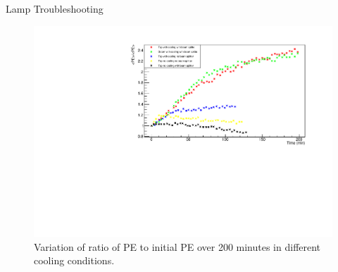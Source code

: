 \documentclass{beamer}
\begin{document}
\begin{frame}{Lamp Troubleshooting}
\begin{figure}
\centering
\includegraphics[height=0.5\textwidth]{NewLampPERatioAug5.pdf}
\caption{Variation of ratio of PE to initial PE over 200 minutes in different cooling conditions.}
\end{figure}
\end{frame}
\end{document}
